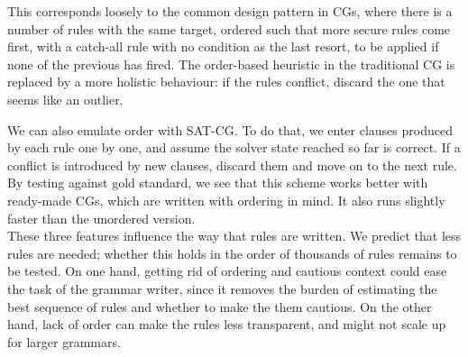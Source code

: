 \documentclass[11pt]{article}
\newcommand{\todo}[1]{{\color{cyan}\textbf{[TODO: }#1\textbf{]}}}
\begin{document}
This corresponds loosely to the common design pattern in
CGs, where there is a number of rules with the same target, ordered
such that more secure rules come first,
with a catch-all rule with no condition as the last resort, to be
applied if none of the previous has fired.
The order-based heuristic in the traditional CG is replaced by a more
holistic behaviour: if the rules conflict, discard the one that seems
like an outlier.






We can also emulate order with SAT-CG. To do that, we enter clauses
produced by each rule one by one, and assume the solver state reached
so far is correct. If a conflict is introduced by new clauses, discard
them and move on to the next rule.
By testing against gold standard, we see that this scheme works better
with ready-made CGs, which are written with ordering in mind.
It also runs slightly faster than the unordered version.
\\






\noindent These three features influence the way that rules are written. 
We predict that less rules are needed; whether this holds in the order
of thousands of rules remains to be tested. On one hand, getting rid
of ordering and cautious context could ease the task of the grammar
writer, since it removes the burden of estimating the best sequence of
rules and whether to make the them cautious. On the other
hand, lack of order can make the rules less transparent, and might not scale up for larger grammars.
\end{document}
